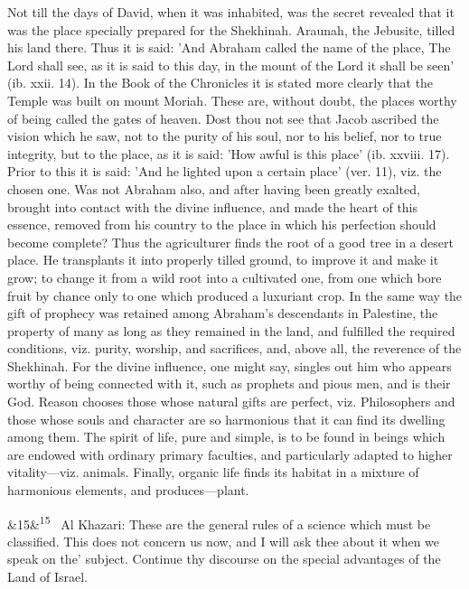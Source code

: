 \documentclass[12pt]{article}
\newcommand{\para}[1][]{\par\noindent\ifx&#1&\else\textsuperscript{\footnotesize #1}~\fi}
\begin{document}
Not till the days of David, when it was inhabited, was the secret revealed that it was the place specially prepared for the Shekhinah. Araunah, the Jebusite, tilled his land there. Thus it is said: 'And Abraham called the name of the place, The Lord shall see, as it is said to this day, in the mount of the Lord it shall be seen' (ib. xxii. 14). In the Book of the Chronicles it is stated more clearly that the Temple was built on mount Moriah. These are, without doubt, the places worthy of being called the gates of heaven. Dost thou not see that Jacob ascribed the vision which he saw, not to the purity of his soul, nor to his belief, nor to true integrity, but to the place, as it is said: 'How awful is this place' (ib. xxviii. 17). Prior to this it is said: 'And he lighted upon a certain place' (ver. 11), viz. the chosen one. Was not Abraham also, and after having been greatly exalted, brought into contact with the divine influence, and made the heart of this essence, removed from his country to the place in which his perfection should become complete? Thus the agriculturer finds the root of a good tree in a desert place. He transplants it into properly tilled ground, to improve it and make it grow; to change it from a wild root into a cultivated one, from one which bore fruit by chance only to one which produced a luxuriant crop. In the same way the gift of prophecy was retained among Abraham's descendants in Palestine, the property of many as long as they remained in the land, and fulfilled the required conditions, viz. purity, worship, and sacrifices, and, above all, the reverence of the Shekhinah. For the divine influence, one might say, singles out him who appears worthy of being connected with it, such as prophets and pious men, and is their God. Reason chooses those whose natural gifts are perfect, viz. Philosophers and those whose souls and character are so harmonious that it can find its dwelling among them. The spirit of life, pure and simple, is to be found in beings which are endowed with ordinary primary faculties, and particularly adapted to higher vitality---viz. animals. Finally, organic life finds its habitat in a mixture of harmonious elements, and produces---plant.

\para[15] Al Khazari: These are the general rules of a science which must be classified. This does not concern us now, and I will ask thee about it when we speak on the' subject. Continue thy discourse on the special advantages of the Land of Israel.
\end{document}
